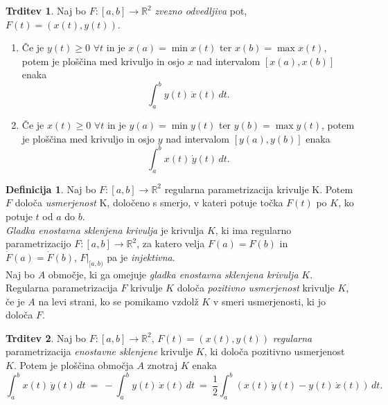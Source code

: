\documentclass[11pt]{article}
\newcommand{\R}{\mathbb{R}}
\theoremstyle{definition}
\newtheorem{definicija}{Definicija}[section]
\theoremstyle{definition}
\newtheorem{trditev}{Trditev}[section]
\theoremstyle{definition}
\theoremstyle{theorem}
\begin{document}
\begin{trditev}

Naj bo $F: [a, b] \rightarrow \R^2$ \textit{zvezno odvedljiva} pot, $F(t) = (x(t), y(t))$.
\begin{enumerate}
	\item Če je $y(t) \geq 0$ $\forall t$ in je $x(a) = \min{x(t)}$ ter $x(b) = \max{x(t)},$ potem je ploščina med krivuljo in osjo $x$ nad intervalom $[x(a), x(b)]$ enaka
	$$\int_a^b y(t)\,\dot{x}(t)\,dt.$$
	
	\item Če je $x(t) \geq 0 $ $\forall t$ in je $y(a) = \min{y(t)}$ ter $y(b) = \max{y(t)}$, potem je ploščina med krivuljo in osjo $y$ nad intervalom $[y(a), y(b)]$ enaka
	$$\int_a^b x(t)\,\dot{y}(t)\,dt.$$
\end{enumerate}
\end{trditev}
\vspace{0.5cm}

\begin{definicija}

Naj bo $F:[a, b] \rightarrow \mathbb{R}^2$ regularna parametrizacija krivulje K. Potem $F$ določa \textit{usmerjenost} K, določeno s smerjo, v kateri potuje točka $F(t)$ po $K$, ko potuje $t$ od $a$ do $b$. \\

\noindent \textit{Gladka enostavna sklenjena krivulja} je krivulja $K$, ki ima regularno \\parametrizacijo $F:[a, b] \rightarrow \mathbb{R}^2$, za katero velja $F(a) = F(b)$ in $\dot{F}(a) = \dot{F}(b)$, $F |_{[a, b)}$ pa je \textit{injektivna}. \\

\noindent Naj bo $A$ območje, ki ga omejuje \textit{gladka enostavna sklenjena krivulja} $K$. \\Regularna parametrizacija $F$ krivulje $K$ določa \textit{pozitivno usmerjenost} \hbox{krivulje} $K$, če je $A$ na levi strani, ko se pomikamo vzdolž $K$ v smeri usmerjenosti, ki jo določa $F$.

\end{definicija}
\vspace{0.5cm}

\begin{trditev}

Naj bo $F: [a, b] \rightarrow \R^2$, $F(t) = (x(t), y(t))$ \textit{regularna} parametrizacija \textit{enostavne sklenjene} krivulje $K$, ki določa pozitivno usmerjenost $K$. Potem je ploščina območja $A$ znotraj $K$ enaka
$$\int_a^b x(t)\,\dot{y}(t)\,dt ~=~ -\int_a^b y(t)\,\dot{x}(t)\,dt ~=~ \frac{1}{2} \int_a^b (x(t)\,\dot{y}(t) - y(t)\,\dot{x}(t))\,dt.$$

\end{trditev}
\vspace{0.5cm}
\end{document}

